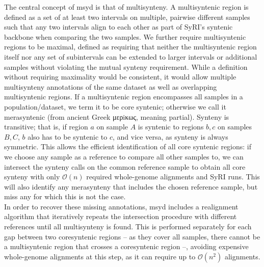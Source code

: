The central concept of msyd is that of multisynteny.
A multisyntenic region is defined as a set of at least two intervals on multiple, pairwise different samples such that any two intervals align to each other as part of SyRI's syntenic backbone when comparing the two samples.
We further require multisyntenic regions to be maximal, defined as requiring that neither the multisyntenic region itself nor any set of subintervals can be extended to larger intervals or additional samples without violating the mutual synteny requirement.
While a definition without requiring maximality would be consistent, it would allow multiple multisynteny annotations of the same dataset as well as overlapping multisyntenic regions.
If a multisyntenic region encompasses all samples in a population/dataset, we term it to be core syntenic; otherwise we call it merasyntenic (from ancient Greek μερiκως, meaning partial).
Synteny is transitive; that is, if region $a$ on sample $A$ is syntenic to regions $b, c$ on samples $B, C$, $b$ also has to be syntenic to $c$, and vice versa, as synteny is always symmetric.
This allows the efficient identification of all core syntenic regions: if we choose any sample as a reference to compare all other samples to, we can intersect the synteny calls on the common reference sample to obtain all core synteny with only $\mathcal{O}(n)$ required whole-genome alignments and SyRI runs.
This will also identify any merasynteny that includes the chosen reference sample, but miss any for which this is not the case.\\
In order to recover these missing annotations, msyd includes a realignment algorithm that iteratively repeats the intersection procedure with different references until all multisynteny is found.
This is performed separately for each gap between two coresyntenic regions -- as they cover all samples, there cannot be a multisyntenic region that crosses a coresyntenic region --, avoiding expensive whole-genome alignments at this step, as it can require up to $\mathcal{O}(n^2)$ alignments.


